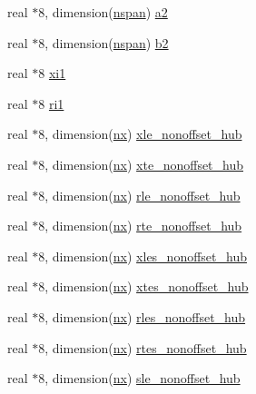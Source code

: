 \begin{DoxyCompactItemize}
\item 
real $\ast$8, dimension(\hyperlink{namespaceglobvar_adeb7d084c25deee7802eab03d40830c5}{nspan}) \hyperlink{namespaceglobvar_a83f42557544a90cc620fc38150229baa}{a2}
\item 
real $\ast$8, dimension(\hyperlink{namespaceglobvar_adeb7d084c25deee7802eab03d40830c5}{nspan}) \hyperlink{namespaceglobvar_a6c6b282f127b3722eee82e9d331f535e}{b2}
\item 
real $\ast$8 \hyperlink{namespaceglobvar_a1ccb279a7cd37dd73fbd7b0e07033e12}{xi1}
\item 
real $\ast$8 \hyperlink{namespaceglobvar_af44048ca90b116b55e4b210a748fb9fd}{ri1}
\item 
real $\ast$8, dimension(\hyperlink{namespaceglobvar_ae4d2e4d1bd4180999afe29337165e1e6}{nx}) \hyperlink{namespaceglobvar_a2b6fa2e27e00de6d45f740070d260fd0}{xle\+\_\+nonoffset\+\_\+hub}
\item 
real $\ast$8, dimension(\hyperlink{namespaceglobvar_ae4d2e4d1bd4180999afe29337165e1e6}{nx}) \hyperlink{namespaceglobvar_a931dc7aa3dcd2482c0788547aacdfd40}{xte\+\_\+nonoffset\+\_\+hub}
\item 
real $\ast$8, dimension(\hyperlink{namespaceglobvar_ae4d2e4d1bd4180999afe29337165e1e6}{nx}) \hyperlink{namespaceglobvar_aa7b9d1ee9e6007aabeaeeacdaa0f3544}{rle\+\_\+nonoffset\+\_\+hub}
\item 
real $\ast$8, dimension(\hyperlink{namespaceglobvar_ae4d2e4d1bd4180999afe29337165e1e6}{nx}) \hyperlink{namespaceglobvar_a43b488138b555f60d355edd22a416753}{rte\+\_\+nonoffset\+\_\+hub}
\item 
real $\ast$8, dimension(\hyperlink{namespaceglobvar_ae4d2e4d1bd4180999afe29337165e1e6}{nx}) \hyperlink{namespaceglobvar_a4774d9677c832856ce10a0773f0bafef}{xles\+\_\+nonoffset\+\_\+hub}
\item 
real $\ast$8, dimension(\hyperlink{namespaceglobvar_ae4d2e4d1bd4180999afe29337165e1e6}{nx}) \hyperlink{namespaceglobvar_aae34d48eb8f1d7c8720c099222880643}{xtes\+\_\+nonoffset\+\_\+hub}
\item 
real $\ast$8, dimension(\hyperlink{namespaceglobvar_ae4d2e4d1bd4180999afe29337165e1e6}{nx}) \hyperlink{namespaceglobvar_a3a4e993f098764c396ac8df346106120}{rles\+\_\+nonoffset\+\_\+hub}
\item 
real $\ast$8, dimension(\hyperlink{namespaceglobvar_ae4d2e4d1bd4180999afe29337165e1e6}{nx}) \hyperlink{namespaceglobvar_a4f08772533a642a2ae689a4e83b8e0e7}{rtes\+\_\+nonoffset\+\_\+hub}
\item 
real $\ast$8, dimension(\hyperlink{namespaceglobvar_ae4d2e4d1bd4180999afe29337165e1e6}{nx}) \hyperlink{namespaceglobvar_a01ec65d098c5cf6f7396ff80126eb25e}{sle\+\_\+nonoffset\+\_\+hub}

\end{DoxyCompactItemize}
